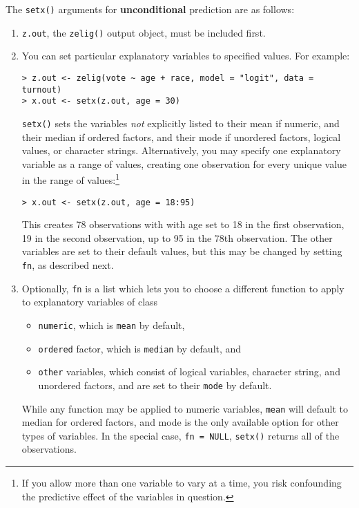\begin{enumerate}
  The {\tt setx()} arguments for \textbf{unconditional} prediction are
  as follows:

   \begin{enumerate}

   \item {\tt z.out}, the {\tt zelig()} output object, must be
     included first.

   \item You can set particular explanatory variables to specified
   values.  For example:
\begin{verbatim}
> z.out <- zelig(vote ~ age + race, model = "logit", data = turnout)
> x.out <- setx(z.out, age = 30)
\end{verbatim}
   \texttt{setx()} sets the variables \emph{not} explicitly listed to
   their mean if numeric, and their median if ordered factors, and
   their mode if unordered factors, logical values, or character
   strings.  Alternatively, you may specify one explanatory variable
   as a range of values, creating one observation for every unique
   value in the range of values:\footnote{If you allow more than one variable to 
vary at a time, you risk confounding the predictive effect of the variables in 
question.} \begin{verbatim}
> x.out <- setx(z.out, age = 18:95)   
\end{verbatim}
   This creates 78 observations with with age set to 18 in the first
   observation, 19 in the second observation, up to 95 in the 78th
   observation.  The other variables are set to their default values,
   but this may be changed by setting {\tt fn}, as described next.
   
 \item Optionally, \texttt{fn} is a list which lets you to choose a different
   function to apply to explanatory variables of class
  \begin{itemize} 
    \item {\tt numeric}, which is {\tt mean} by default,
    \item {\tt ordered} factor, which is {\tt median} by default, and
    \item {\tt other} variables, which consist of logical variables,
      character string, and unordered factors, and are set to their
      {\tt mode} by default.
  \end{itemize}
  While any function may be applied to numeric variables, {\tt mean}
  will default to median for ordered factors, and mode is the only
  available option for other types of variables. In the special case,
  {\tt fn = NULL}, {\tt setx()} returns all of the observations.
   

\end{enumerate}
\end{enumerate}
